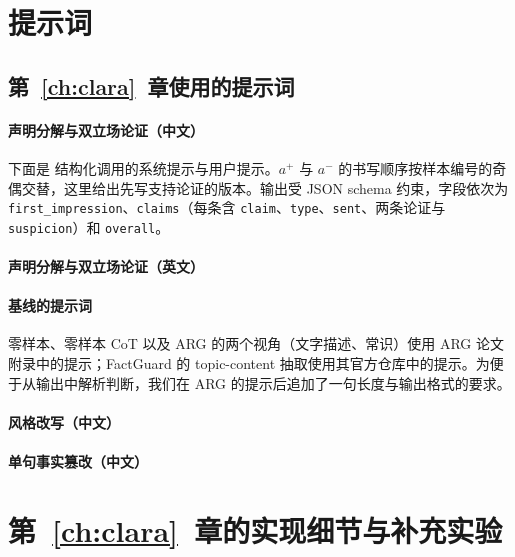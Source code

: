 \chapter{提示词}\label{app:prompt}

\section{第~\ref{ch:clara}~章使用的提示词}\label{app:prompt-clara}

\subsubsection{声明分解与双立场论证（中文）}
下面是 \method{} 结构化调用的系统提示与用户提示。$a^+$ 与 $a^-$ 的书写顺序按样本编号的奇偶交替，这里给出先写支持论证的版本。输出受 JSON schema 约束，字段依次为 \texttt{first\_impression}、\texttt{claims}（每条含 \texttt{claim}、\texttt{type}、\texttt{sent}、两条论证与 \texttt{suspicion}）和 \texttt{overall}。



\subsubsection{声明分解与双立场论证（英文）}



\subsubsection{基线的提示词}
零样本、零样本 CoT 以及 ARG 的两个视角（文字描述、常识）使用 ARG 论文附录中的提示\citep{hu2024bad}；FactGuard 的 topic-content 抽取使用其官方仓库中的提示\citep{he2026factguard}。为便于从输出中解析判断，我们在 ARG 的提示后追加了一句长度与输出格式的要求。

\subsubsection{风格改写（中文）}



\subsubsection{单句事实篡改（中文）}



\chapter{第~\ref{ch:clara}~章的实现细节与补充实验}\label{app:clara}

